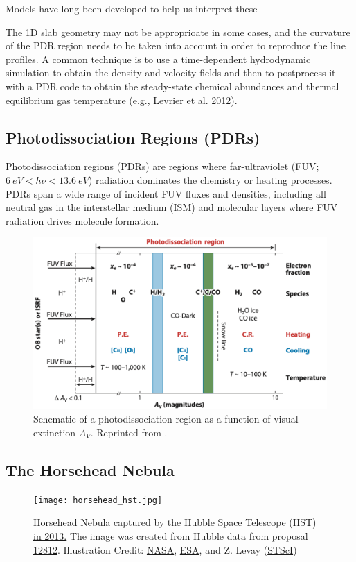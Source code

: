 \documentclass[12pt,a4paper]{article}
\begin{document}
Models have long been developed to help us interpret these


The 1D slab geometry may not be approprioate in some cases, and the curvature of the PDR region needs to be taken into account in order to reproduce the line profiles. A common technique is to use a time-dependent hydrodynamic simulation to obtain the density and velocity fields and then to postprocess it with a PDR code to obtain the steady-state chemical abundances and thermal equilibrium gas temperature (e.g., Levrier et al. 2012).

\subsection{Photodissociation Regions (PDRs)}
Photodissociation regions (PDRs) are regions where far-ultraviolet (FUV; $\qty{6}{eV} < h\nu < \qty{13.6}{eV}$) radiation dominates the chemistry or heating processes\parencite{Tielens1985}. PDRs span a wide range of incident FUV fluxes and densities, including all neutral gas in the interstellar medium (ISM) and molecular layers where FUV radiation drives molecule formation.

\begin{figure}
    \centering
    \includegraphics[width=.7\textwidth,keepaspectratio]{figures/PDRScheme_Wolfire2022fig2.png}
    \caption{Schematic of a photodissociation region as a function of visual extinction $A_V$. Reprinted from \textcite{Wolfire2022}.}
\end{figure}
\subsection{The Horsehead Nebula}
\begin{figure}
    \centering
    \texttt{[image: horsehead\_hst.jpg]}
    \caption{\href{https://hubblesite.org/contents/media/images/2013/12/3166-Image.html?keyword=Horsehead}{Horsehead Nebula captured by the Hubble Space Telescope (HST) in 2013.} The image was created from Hubble data from proposal \href{http://archive.stsci.edu/proposal_search.php?mission=hst&id=12812}{12812}. Illustration Credit: \href{http://www.nasa.gov/}{NASA}, \href{http://www.spacetelescope.org/}{ESA}, and Z. Levay (\href{http://www.stsci.edu/}{STScI})} 
\end{figure}
\end{document}
